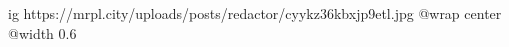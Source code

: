  
 
 
 
 

\ifcmt
  ig https://mrpl.city/uploads/posts/redactor/cyykz36kbxjp9etl.jpg
  @wrap center
  @width 0.6
\fi

